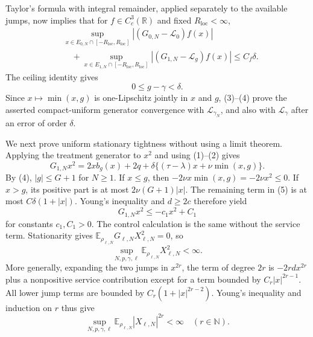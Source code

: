 Taylor's formula with integral remainder, applied separately to the available jumps, now implies that for \(f\in C_c^3(\mathbb R)\) and fixed \(R_{\mathrm{loc}}<\infty\),
\[
 \begin{split}
 &\sup_{x\in E_{0,N}\cap[-R_{\mathrm{loc}},R_{\mathrm{loc}}]}
   |(G_{0,N}-\mathcal L_0)f(x)|\\
 &\quad+
 \sup_{x\in E_{1,N}\cap[-R_{\mathrm{loc}},R_{\mathrm{loc}}]}
   |(G_{1,N}-\mathcal L_g)f(x)|
 \leq C_f\delta.                                               \tag{3}
 \end{split}
\]
The ceiling identity gives
\[
 0\leq g-\gamma<\delta.                                       \tag{4}
\]
Since \(x\mapsto\min(x,g)\) is one-Lipschitz jointly in \(x\) and \(g\), (3)--(4) prove the asserted compact-uniform generator convergence with \(\mathcal L_{\gamma_N}\), and also with \(\mathcal L_\gamma\) after an error of order \(\delta\).

We next prove uniform stationary tightness without using a limit theorem.  Applying the treatment generator to \(x^2\) and using (1)--(2) gives
\[
 G_{1,N}x^2=2xb_g(x)+2q+\delta\{(\tau-\lambda)x+\nu\min(x,g)\}. \tag{5}
\]
By (4), \(|g|\leq G+1\) for \(N\geq1\).  If \(x\leq g\), then \(-2\nu x\min(x,g)=-2\nu x^2\leq0\).  If \(x>g\), its positive part is at most \(2\nu(G+1)|x|\).  The remaining term in (5) is at most \(C\delta(1+|x|)\).  Young's inequality and \(d\geq2c\) therefore yield
\[
 G_{1,N}x^2\leq-c_1x^2+C_1                                  \tag{6}
\]
for constants \(c_1,C_1>0\).  The control calculation is the same without the service term.  Stationarity gives \(\mathbb E_{\rho_{\ell,N}}G_{\ell,N}X_{\ell,N}^2=0\), so
\[
 \sup_{N,p,\gamma,\ell}\mathbb E_{\rho_{\ell,N}}X_{\ell,N}^2<\infty. \tag{7}
\]
More generally, expanding the two jumps in \(x^{2r}\), the term of degree \(2r\) is \(-2rdx^{2r}\) plus a nonpositive service contribution except for a term bounded by \(C_r|x|^{2r-1}\).  All lower jump terms are bounded by \(C_r(1+|x|^{2r-2})\).  Young's inequality and induction on \(r\) thus give
\[
 \sup_{N,p,\gamma,\ell}\mathbb E_{\rho_{\ell,N}}|X_{\ell,N}|^{2r}<\infty
 \quad(r\in\mathbb N).                                      \tag{8}
\]

